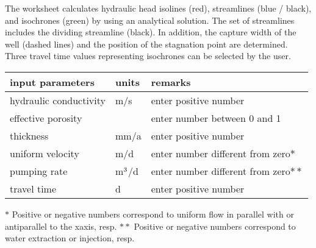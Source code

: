 \documentclass[letterpaper,10pt,english]{sphinxmanual}
\begin{document}
The worksheet calculates hydraulic head isolines (red), streamlines (blue / black), and isochrones (green) 
by using an analytical solution. The set of streamlines includes the dividing streamline (black). 
In addition, the capture width of the well (dashed lines) and the position of the stagnation point are determined. 
Three travel time values representing isochrones can be selected by the user. 


\begin{savenotes}\sphinxattablestart
\centering
\begin{tabulary}{\linewidth}[t]{|T|T|T|}
\hline
\sphinxstyletheadfamily 
input parameters
&\sphinxstyletheadfamily 
units
&\sphinxstyletheadfamily 
remarks
\\
\hline
hydraulic conductivity
&
m/s
&
enter positive number
\\
\hline
effective porosity
&
\sphinxhyphen{}
&
enter number between 0 and 1
\\
\hline
thickness
&
mm/a
&
enter positive number
\\
\hline
uniform velocity
&
m/d
&
enter number different from zero\(*\)
\\
\hline
pumping rate
&
m\(\sp{\text{3}}\)/d
&
enter number different from zero\(**\)
\\
\hline
travel time
&
d
&
enter positive number
\\
\hline
\end{tabulary}
\par
\sphinxattableend\end{savenotes}

\(*\) Positive or negative numbers correspond to uniform flow in parallel with or antiparallel to the x\sphinxhyphen{}axis, resp. 
\(**\) Positive or negative numbers correspond to water extraction or injection, resp.

\end{document}
